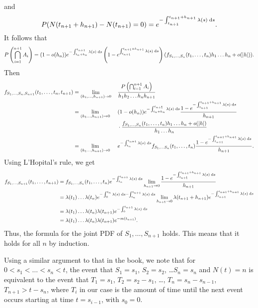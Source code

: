 \documentclass{homework}
\begin{document}
\begin{alphaparts}
		and
		\begin{equation*}
			P(N(t_{n+1} + h_{n+1}) - N(t_{n+1}) = 0) = e^{-\int_{t_{n+1}}^{t_{n+1}+h_{n+1}}\lambda(s)\;\text{d} s}.
		\end{equation*}
		It follows that
		\begin{equation*}
			P\left(\bigcap_{i=1}^{n+1}A_i\right) = (1-o(h_n))e^{-\int_{t_n+h_n}^{t_{n+1}}\lambda(s)\;\text{d} s}\left(1-e^{\int_{t_{n+1}}^{t_{n+1}+h_{n+1}}\lambda(s)\;\text{d} s}\right)(f_{S_1,\dots,S_n}(t_1,\dots, t_n)h_1\dots h_n + o(|h|)).
		\end{equation*}
		Then
		\begin{alignat*}{2}
			f_{S_1,\dots, S_n, S_{n+1}}(t_1,\dots, t_n, t_{n+1}) &= \lim_{(h_1,\dots, h_{n+1})\to 0}{}&& \frac{P\left(\bigcap_{i=1}^{n+1}A_i\right)}{h_1h_2\dots h_nh_{n+1}}	\\
			&=\lim_{(h_1\dots, h_{n+1})\to 0}{} && (1-o(h_n))e^{-\int_{t_n+h_n}^{t_{n+1}}\lambda(s)\;\text{d} s}\frac{1-e^{-\int_{t_{n+1}}^{t_{n+1}+h_{n+1}}\lambda(s)\;\text{d} s}}{h_{n+1}}\\ &&&{}\cdot \frac{f_{S_1,\dots,S_n}(t_1,\dots, t_n)h_1\dots h_n + o(|h|)}{h_1\dots h_n} \\
			&= \lim_{(h_1\dots, h_{n+1})\to 0}{} &&e^{-\int_{t_n}^{t_{n+1}}\lambda(s)\;\text{d} s}f_{S_1,\dots S_n}(t_1,\dots, t_n)\frac{1-e^{-\int_{t_{n+1}}^{t_{n+1}+h_{n+1}}\lambda(s)\;\text{d} s}}{h_{n+1}}.
		\end{alignat*}
		Using L'Hopital's rule, we get
		\begin{align*}
			f_{S_1,\dots,S_{n+1}}(t_1,\dots, t_{n+1}) &= f_{S_1,\dots, S_n}(t_1,\dots, t_n)e^{-\int_{t_n}^{t_{n+1}}\lambda(s)\;\text{d} s} \lim_{h_{n+1}\to 0}\frac{1 - e^{-\int_{t_{n+1}}^{t_{n+1}+h_{n+1}}\lambda(s)\;\text{d} s}}{h_{n+1}} \\
			&= \lambda(t_1)\dots \lambda(t_n)e^{-\int_{0}^{t_n}\lambda(s)\;\text{d} s - \int_{t_{n}}^{t_{n+1}}\lambda(s)\;\text{d} s} \lim_{h_{n+1}\to 0}\lambda(t_{n+1} + h_{n+1})e^{-\int_{t_{n+1}}^{t_{n+1}+h_{n+1}}\lambda(s)\;\text{d} s} \\
			&= \lambda(t_1)\dots \lambda(t_n)\lambda(t_{n+1})e^{-\int_{0}^{t_{n+1}}\lambda (s)\;\text{d} s} \\
			&= \lambda(t_1)\dots \lambda(t_n)\lambda(t_{n+1})e^{-m(t_{n+1})}.
		\end{align*}
		Thus, the formula for the joint PDF of $S_1, \dots, S_{n+1}$ holds. This means that it holds for all $n$ by induction.
		
		\questionpart Using a similar argument to that in the book, we note that for $0 < s_1 < \dots < s_n < t$, the event that $S_1 = s_1$, $S_2 = s_2$, \dots $S_n = s_n$ and $N(t) = n$ is equivalent to the event that $T_1 = s_1$, $T_2 = s_2 - s_1$, \dots, $T_n = s_n - s_{n-1}$, $T_{n+1} > t - s_n$, where $T_i$ in our case is the amount of time until the next event occurs starting at time $t = s_{i-1}$, with $s_0 = 0$.
		

\end{alphaparts}
\end{document}
